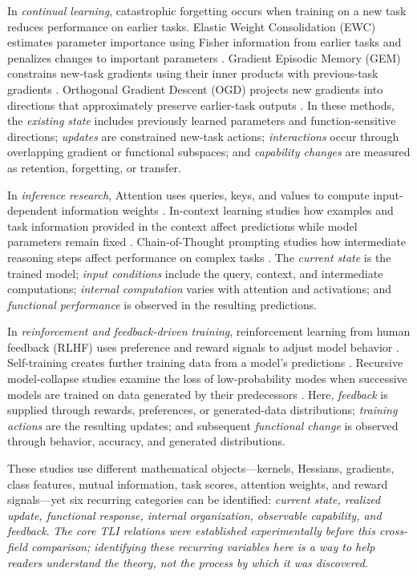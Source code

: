 \documentclass[conference,10pt]{IEEEtran}
\begin{document}
In \emph{continual learning}, catastrophic forgetting occurs when training on a new task reduces performance on earlier tasks. Elastic Weight Consolidation (EWC) estimates parameter importance using Fisher information from earlier tasks and penalizes changes to important parameters \cite{kirkpatrick2017}. Gradient Episodic Memory (GEM) constrains new-task gradients using their inner products with previous-task gradients \cite{lopezpaz2017}. Orthogonal Gradient Descent (OGD) projects new gradients into directions that approximately preserve earlier-task outputs \cite{farajtabar2020}. In these methods, the \emph{existing state} includes previously learned parameters and function-sensitive directions; \emph{updates} are constrained new-task actions; \emph{interactions} occur through overlapping gradient or functional subspaces; and \emph{capability changes} are measured as retention, forgetting, or transfer.

In \emph{inference research}, Attention uses queries, keys, and values to compute input-dependent information weights \cite{vaswani2017}. In-context learning studies how examples and task information provided in the context affect predictions while model parameters remain fixed \cite{brown2020}. Chain-of-Thought prompting studies how intermediate reasoning steps affect performance on complex tasks \cite{wei2022}. The \emph{current state} is the trained model; \emph{input conditions} include the query, context, and intermediate computations; \emph{internal computation} varies with attention and activations; and \emph{functional performance} is observed in the resulting predictions.

In \emph{reinforcement and feedback-driven training}, reinforcement learning from human feedback (RLHF) uses preference and reward signals to adjust model behavior \cite{ouyang2022}. Self-training creates further training data from a model's predictions \cite{xie2020}. Recursive model-collapse studies examine the loss of low-probability modes when successive models are trained on data generated by their predecessors \cite{shumailov2024}. Here, \emph{feedback} is supplied through rewards, preferences, or generated-data distributions; \emph{training actions} are the resulting updates; and subsequent \emph{functional change} is observed through behavior, accuracy, and generated distributions.

These studies use different mathematical objects---kernels, Hessians, gradients, class features, mutual information, task scores, attention weights, and reward signals---yet six recurring categories can be identified: \emph{current state, realized update, functional response, internal organization, observable capability, and feedback}. \emph{The core TLI relations were established experimentally before this cross-field comparison; identifying these recurring variables here is a way to help readers understand the theory, not the process by which it was discovered.}
\end{document}
